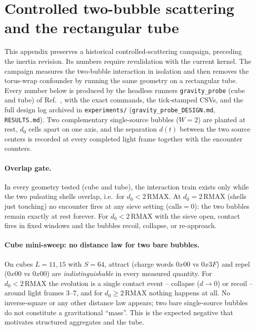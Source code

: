 \documentclass{ijuc}
\begin{document}
\section{Controlled two-bubble scattering and the rectangular tube\label{app:gravity-probes}}

This appendix preserves a historical controlled-scattering campaign, preceding the inertia revision. Its numbers require revalidation with the current kernel. The campaign measures the
two-bubble interaction in isolation and then removes the torus-wrap
confounder by running the same geometry on a rectangular tube.  Every number
below is produced by the headless runners \texttt{gravity\_probe} (cube and
tube) of Ref.~\cite{af_neto}, with the exact commands, the tick-stamped
CSVs, and the full design log archived in \texttt{experiments/}
(\texttt{gravity\_probe\_DESIGN.md}, \texttt{RESULTS.md}).  Two complementary
single-source bubbles ($W=2$) are planted at rest, $d_0$ cells apart on one
axis, and the separation $d(t)$ between the two source centers is recorded at
every completed light frame together with the encounter counters.

\paragraph{Overlap gate.} In every geometry tested (cube and tube), the
interaction train exists only while the two pulsating shells overlap, i.e.\
for $d_0 < 2\,\mathrm{RMAX}$.  At $d_0 = 2\,\mathrm{RMAX}$ (shells just
touching) no encounter fires at any sieve setting ($\mathrm{calls}=0$): the
two bubbles remain exactly at rest forever.  For $d_0 < 2\,\mathrm{RMAX}$
with the sieve open, contact fires in fixed windows and the bubbles recoil,
collapse, or re-approach.

\paragraph{Cube mini-sweep: no distance law for two bare bubbles.} On cubes
$L=11,15$ with $S=64$, attract (charge words $0x00$ vs $0x3F$) and repel
($0x00$ vs $0x00$) are \emph{indistinguishable} in every measured quantity.
For $d_0<2\,\mathrm{RMAX}$ the evolution is a single contact event --
collapse ($d\to0$) or recoil -- around light frames $3$--$7$, and for
$d_0\ge2\,\mathrm{RMAX}$ nothing happens at all.  No inverse-square or any
other distance law appears; two bare single-source bubbles do not constitute
a gravitational ``mass''.  This is the expected negative that motivates
structured aggregates and the tube.
\end{document}
